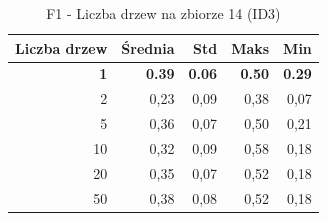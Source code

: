 \begin{table}[htbp]
\centering
\small
\setlength{\tabcolsep}{6pt}
\renewcommand{\arraystretch}{1.2}
\caption{F1 - Liczba drzew na zbiorze 14 (ID3)}
\label{tab:ID3_tree_count_14_f1}
\begin{tabular}{r|r|r|r|r}
\toprule
Liczba drzew & Średnia & Std & Maks & Min \\
\hline
\textbf{1} & \textbf{0.39} & \textbf{0.06} & \textbf{0.50} & \textbf{0.29} \\
2 & 0,23 & 0,09 & 0,38 & 0,07 \\
5 & 0,36 & 0,07 & 0,50 & 0,21 \\
10 & 0,32 & 0,09 & 0,58 & 0,18 \\
20 & 0,35 & 0,07 & 0,52 & 0,18 \\
50 & 0,38 & 0,08 & 0,52 & 0,18 \\
\bottomrule
\end{tabular}
\end{table}
